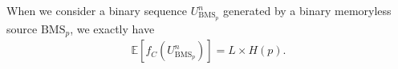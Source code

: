 %
%
When we consider a binary sequence $U_{\mathrm{BMS}_p}^n$ generated by a binary memoryless source $\mathrm{BMS}_p$, we exactly have
%
\begin{align}\label{eq:E_BMS}
	\mathbb{E}[f_C(U_{\mathrm{BMS}_p}^n)] = L\times H(p).
\end{align}
%
